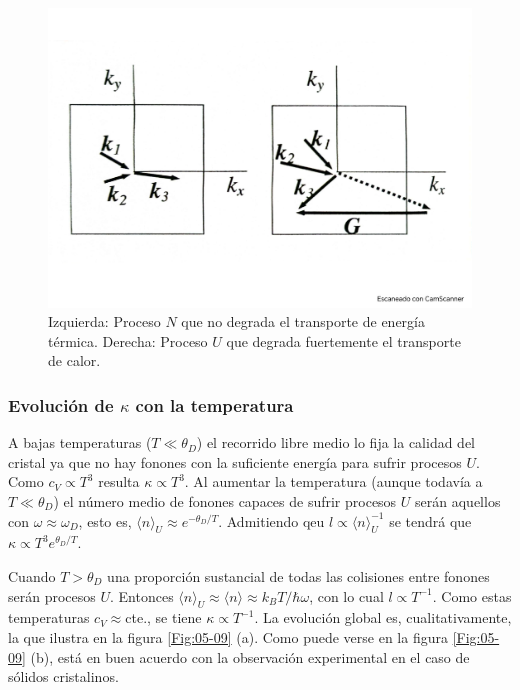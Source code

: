 \begin{figure}[h!] \centering
    \includegraphics[scale=0.35]{Cuerpo/Ch_05/Fotos libro 8.pdf}
    \caption{Izquierda: Proceso $N$ que no degrada el transporte de energía térmica. Derecha: Proceso $U$ que degrada fuertemente el transporte de calor.}
    \label{Fig:05-08}
\end{figure}    

\subsubsection{Evolución de $\kappa$ con la temperatura}

A bajas temperaturas ($T\ll \theta_D$) el recorrido libre medio lo fija la calidad del cristal ya que no hay fonones con la suficiente energía para sufrir procesos $U$. Como $c_V \propto T^3$ resulta $\kappa \propto T^3$. Al aumentar la temperatura (aunque todavía a $T\ll \theta_D$) el número medio de fonones capaces de sufrir procesos $U$ serán aquellos con $\omega\approx\omega_D$, esto es, $\langle n\rangle_U \approx e^{-\theta_D / T}$. Admitiendo qeu $l\propto \langle n \rangle_U^{-1}$ se tendrá que $\kappa \propto T^3 e^{\theta_D/T}$. 

Cuando $T>\theta_D$ una proporción sustancial de todas las colisiones entre fonones serán procesos $U$. Entonces $\langle n \rangle_U \approx \langle n \rangle \approx k_B T / \hbar \omega$, con lo cual $l \propto T^{-1}$. Como estas temperaturas $c_V\approx$cte., se tiene $\kappa \propto T^{-1}$. La evolución global es, cualitativamente, la que ilustra en la figura \ref{Fig:05-09} (a). Como puede verse en la figura \ref{Fig:05-09} (b), está en buen acuerdo con la observación experimental en el caso de sólidos cristalinos.

